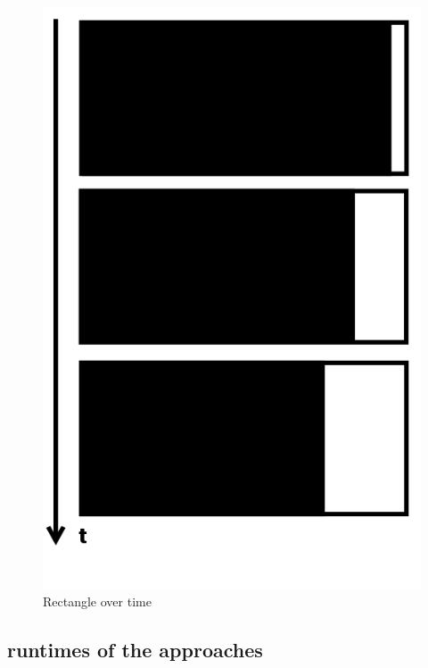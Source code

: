 \documentclass[journal,final,a4paper,twoside]{PS}
\begin{document}
\begin{figure}[h]
\begin{center}
\includegraphics[scale=0.3]{./pics/pattern.png}
\caption{Rectangle over time}
\label{fig:blockOverTime}
\end{center}
\end{figure}

\subsection{runtimes of the approaches}
\label{sec:runtime}
\end{document}
